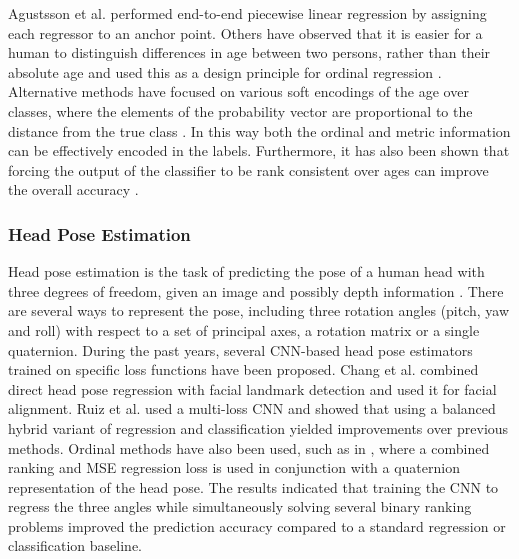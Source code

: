 \documentclass[10pt, conference, a4paper]{IEEEtran}
\begin{document}
Agustsson et al. \cite{agustsson2017anchored} performed end-to-end piecewise linear regression by assigning each regressor to an anchor point. Others have observed that it is easier for a human to distinguish differences in age between two persons, rather than their absolute age and used this as a design principle for ordinal regression \cite{zhang2017quantifying, niu2016ordinal}. Alternative methods have focused on various soft encodings of the age over classes, where the elements of the probability vector are proportional to the distance from the true class \cite{gao2017deep, zeng2019soft, diaz2019soft}. In this way both the ordinal and metric information can be effectively encoded in the labels. Furthermore, it has also been shown that forcing the output of the classifier to be rank consistent over ages can improve the overall accuracy \cite{beckham2017unimodal, cao2019rank}.

\subsubsection{Head Pose Estimation}
Head pose estimation is the task of predicting the pose of a human head with three degrees of freedom, given an image and possibly depth information \cite{murphy2008head}. There are several ways to represent the pose, including three rotation angles (pitch, yaw and roll) with respect to a set of principal axes, a  rotation matrix or a single quaternion. During the past years, several CNN-based head pose estimators trained on specific loss functions have been proposed. Chang et al. \cite{chang2017faceposenet} combined direct head pose regression with facial landmark detection and used it for facial alignment. Ruiz et al. \cite{ruiz2018fine} used a multi-loss CNN and showed that using a balanced hybrid variant of regression and classification yielded improvements over previous methods. Ordinal methods have also been used, such as in \cite{hsu2018quatnet}, where a combined ranking and MSE regression loss is used in conjunction with a quaternion representation of the head pose. The results indicated that training the CNN to regress the three angles while simultaneously solving several binary ranking problems improved the prediction accuracy compared to a standard regression or classification baseline. 
\end{document}
